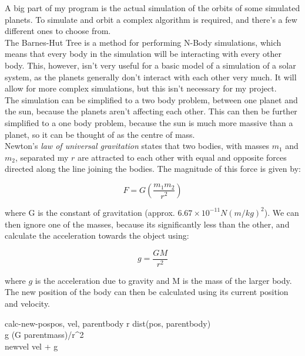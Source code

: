 A big part of my program is the actual simulation of the orbits of some
simulated planets. To simulate and orbit a complex algorithm is required, and
there's a few different ones to choose from. \\

The Barnes-Hut Tree is a method for performing N-Body simulations, which means
that every body in the simulation will be interacting with every other body.
This, however, isn't very useful for a basic model of a simulation of a solar
system, as the planets generally don't interact with each other very much. It
will allow for more complex simulations, but this isn't necessary for my
project. \\

The simulation can be simplified to a two body problem, between one planet and
the sun, because the planets aren't affecting each other. This can then be
further simplified to a one body problem, because the sun is much more massive
than a planet, so it can be thought of as the centre of mass. \\

Newton's \emph{law of universal gravitation} states that two bodies, with masses
$m_1$ and $m_2$, separated my $r$ are attracted to each other with equal and
opposite forces directed along the line joining the bodies. The magnitude of
this force is given by:

\begin{equation}
	F = G (\frac{m_1 m_2}{r^2})	
\end{equation}

where G is the constant of gravitation (approx. $6.67 \times 10^{-11}
N(m/kg)^2$). We can then ignore one of the masses, because its significantly
less than the other, and calculate the acceleration towards the object using:

\begin{equation}
	g = \frac{GM}{r^2}
\end{equation}

where $g$ is the acceleration due to gravity and M is the mass of the larger
body. The new position of the body can then be calculated using its current
position and velocity.

\begin{pseudocode}{calc-new-pos}{pos, vel, parentbody}
	r \GETS dist(pos, parentbody)	 \\
	g \GETS (G \cdot parentmass)/r^2 \\
	newvel \GETS vel + g \\
\end{pseudocode}

